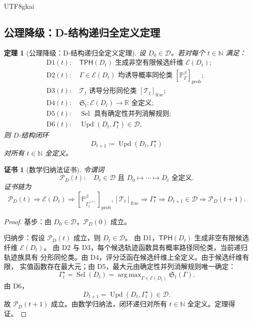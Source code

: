 \documentclass[12pt]{article}
\newtheorem{theorem}{定理}[section]
\newtheorem{Certificate}{证书}[section]
\newcommand{\NN}{\mathbb{N}}
\newcommand{\RR}{\mathbb{R}}
\newcommand{\TPH}{\ensuremath{\mathsf{TPH}}}
\newcommand{\DefEq}{\coloneqq}
\DeclareMathOperator{\Sel}{Sel}
\DeclareMathOperator{\Upd}{Upd}
\DeclareMathOperator*{\argmax}{arg\,max}
\begin{document}
\begin{CJK*}{UTF8}{gkai}
\subsection{公理降级：D-结构递归全定义定理}
\label{subsec:d-structure-well-defined}

\begin{theorem}[公理降级：D-结构递归全定义定理]
设 \(D_0\in\mathcal D\)。若对每个 \(t\in\NN\) 满足：
\[
\begin{aligned}
&\mathrm{D1}(t):\quad \TPH(D_t)\text{ 生成非空有限候选纤维 }\mathcal E(D_t);\\
&\mathrm{D2}(t):\quad \Gamma\in\mathcal E(D_t)\text{ 均诱导概率同伦类 }
[\mathbb P_\Gamma^\beta]_{\mathrm{prob}};\\
&\mathrm{D3}(t):\quad \mathcal T_t\text{ 诱导分形同伦类 }[\mathcal T_t]_{\mathrm{frac}};\\
&\mathrm{D4}(t):\quad \mathfrak S_t:\mathcal E(D_t)\to\RR\text{ 全定义};\\
&\mathrm{D5}(t):\quad \Sel\text{ 具有确定性并列消解规则};\\
&\mathrm{D6}(t):\quad \Upd(D_t,\Gamma_t^\star)\in\mathcal D,
\end{aligned}
\]
则 \(D\)-结构闭环
\[
D_{t+1}\DefEq \Upd(D_t,\Gamma_t^\star)
\]
对所有 \(t\in\NN\) 全定义。
\end{theorem}

\begin{Certificate}[数学归纳法证书]
令谓词
\[
\mathcal P_D(t):
\quad
D_t\in\mathcal D
\text{ 且 }
D_0\mapsto\cdots\mapsto D_t
\text{ 全定义}.
\]
证书链为
\[
\boxed{
\mathcal P_D(t)
\Rightarrow
\mathcal E(D_t)
\Rightarrow
[\mathbb P_{\Gamma_t^{(r)}}^\beta]_{\mathrm{prob}},
[\mathcal T_t]_{\mathrm{frac}}
\Rightarrow
\Gamma_t^\star
\Rightarrow
D_{t+1}\in\mathcal D
\Rightarrow
\mathcal P_D(t+1).
}
\]
\end{Certificate}

\begin{proof}
基步：由 \(D_0\in\mathcal D\)，\(\mathcal P_D(0)\) 成立。

归纳步：假设 \(\mathcal P_D(t)\) 成立，则 \(D_t\in\mathcal D\)。
由 D1，\(\TPH(D_t)\) 生成非空有限候选纤维 \(\mathcal E(D_t)\)。
由 D2 与 D3，每个候选轨迹函数具有概率路径同伦类，当前递归轨迹族具有
分形同伦类。由 D4，评分泛函在候选纤维上全定义。由于候选纤维有限，
实值函数存在最大元；由 D5，最大元由确定性并列消解规则唯一确定：
\[
\Gamma_t^\star
=
\Sel(D_t)
=
\argmax_{\Gamma\in\mathcal E(D_t)}
\mathfrak S_t(\Gamma).
\]
由 D6，
\[
D_{t+1}=\Upd(D_t,\Gamma_t^\star)\in\mathcal D.
\]
故 \(\mathcal P_D(t+1)\) 成立。由数学归纳法，闭环递归对所有
\(t\in\NN\) 全定义。定理得证。
\end{proof}


\end{CJK*}
\end{document}
